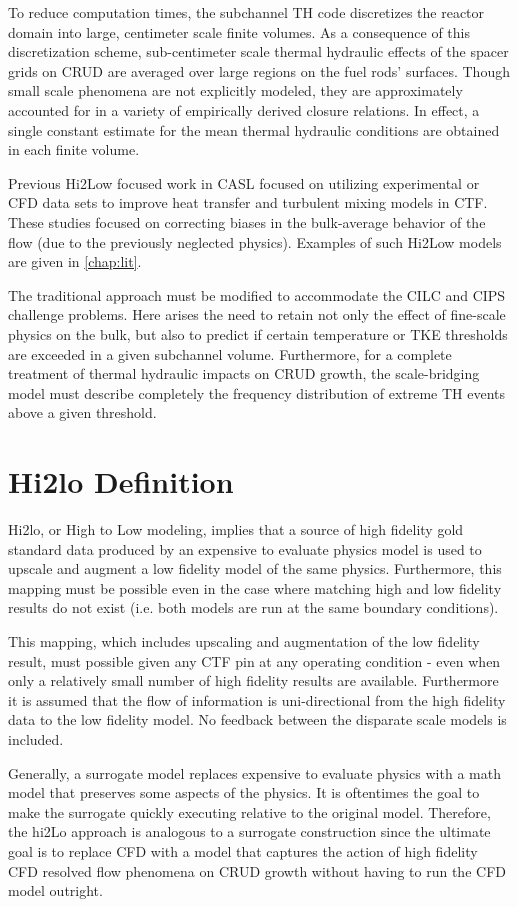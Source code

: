 To reduce computation times, the subchannel TH code discretizes the reactor
domain into large, centimeter scale finite volumes. As a consequence of this
discretization scheme, sub-centimeter scale thermal hydraulic effects of the
spacer grids on CRUD are averaged over large regions on the fuel rods'
surfaces.  Though small scale phenomena are not explicitly modeled, they are
approximately accounted for in a variety of empirically derived closure
relations.  In effect, a single constant estimate for the mean thermal
hydraulic conditions are obtained in each finite volume.

Previous Hi2Low focused work in CASL focused on utilizing experimental or CFD
data sets to improve heat transfer and turbulent mixing models in CTF.  These studies focused on
correcting biases in the bulk-average behavior of the flow (due to the
previously neglected physics).  Examples of such Hi2Low models are given in
\autoref{chap:lit}.

The traditional approach must be modified to accommodate the CILC and CIPS
challenge problems.  Here arises the need to retain not only the effect of
fine-scale physics on the bulk, but also to predict if certain temperature or
TKE thresholds are exceeded in a given subchannel volume.  Furthermore, for a
complete treatment of thermal hydraulic impacts on CRUD growth, the
scale-bridging model must describe completely the frequency distribution of
extreme TH events above a given threshold.


\section{Hi2lo Definition}


Hi2lo, or High to Low modeling, implies that a source of high fidelity gold standard data produced by an expensive to evaluate physics model is used to upscale and augment a low fidelity model of the same physics.
Furthermore, this mapping must be possible even in the case where matching high and low fidelity results do not exist (i.e. both models are run at the same boundary conditions).

This mapping, which includes upscaling and augmentation of the low fidelity result, must possible given any CTF pin at any operating condition - even when only a relatively small number of high fidelity results are available.  Furthermore it is assumed that the flow of information is uni-directional from the high fidelity data to the low fidelity model.  No feedback between the disparate scale models is included.

Generally, a surrogate model replaces expensive to evaluate physics with a math model that preserves some aspects of the physics.  It is oftentimes the goal to make the surrogate quickly executing relative to the original model. Therefore, the hi2Lo approach is analogous to a surrogate construction since the ultimate goal is to replace CFD with a model that captures the action of high fidelity CFD resolved flow phenomena on CRUD growth without having to run the CFD model outright.


